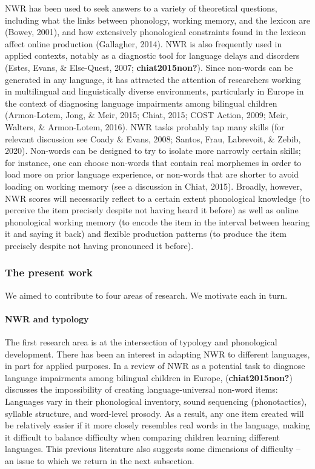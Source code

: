 \documentclass[
  english,
  ,man,floatsintext]{apa6}
\let\oldparagraph\paragraph
\renewcommand{\paragraph}[1]{\oldparagraph{#1}\mbox{}}
\begin{document}
NWR has been used to seek answers to a variety of theoretical questions, including what the links between phonology, working memory, and the lexicon are (Bowey, 2001), and how extensively phonological constraints found in the lexicon affect online production (Gallagher, 2014). NWR is also frequently used in applied contexts, notably as a diagnostic tool for language delays and disorders (Estes, Evans, \& Else-Quest, 2007; \textbf{chiat2015non?}). Since non-words can be generated in any language, it has attracted the attention of researchers working in multilingual and linguistically diverse environments, particularly in Europe in the context of diagnosing language impairments among bilingual children (Armon-Lotem, Jong, \& Meir, 2015; Chiat, 2015; COST Action, 2009; Meir, Walters, \& Armon-Lotem, 2016). NWR tasks probably tap many skills (for relevant discussion see Coady \& Evans, 2008; Santos, Frau, Labrevoit, \& Zebib, 2020). Non-words can be designed to try to isolate more narrowly certain skills; for instance, one can choose non-words that contain real morphemes in order to load more on prior language experience, or non-words that are shorter to avoid loading on working memory (see a discussion in Chiat, 2015). Broadly, however, NWR scores will necessarily reflect to a certain extent phonological knowledge (to perceive the item precisely despite not having heard it before) as well as online phonological working memory (to encode the item in the interval between hearing it and saying it back) and flexible production patterns (to produce the item precisely despite not having pronounced it before).

\hypertarget{the-present-work}{%
\subsubsection{The present work}\label{the-present-work}}

We aimed to contribute to four areas of research. We motivate each in turn.

\hypertarget{nwr-and-typology}{%
\paragraph{NWR and typology}\label{nwr-and-typology}}

The first research area is at the intersection of typology and phonological development. There has been an interest in adapting NWR to different languages, in part for applied purposes. In a review of NWR as a potential task to diagnose language impairments among bilingual children in Europe, (\textbf{chiat2015non?}) discusses the impossibility of creating language-universal non-word items: Languages vary in their phonological inventory, sound sequencing (phonotactics), syllable structure, and word-level prosody. As a result, any one item created will be relatively easier if it more closely resembles real words in the language, making it difficult to balance difficulty when comparing children learning different languages. This previous literature also suggests some dimensions of difficulty -- an issue to which we return in the next subsection.
\end{document}
